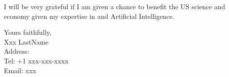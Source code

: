 \documentclass[11pt]{article}
\begin{document}
I will be very grateful if I am given a chance to benefit the US science and economy given my expertise in \fie{} and Artificial Intelligence.\\

\bigskip
\bigskip

Yours faithfully,\\

\vspace{1.5em}
Xxx LastName\\

Address: \\
Tel: +1 xxx-xxx-xxxx\\
Email: xxx\\


\pagebreak


\renewcommand\refname{List of Exhibits}
\end{document}
